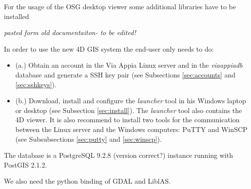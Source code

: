 For the usage of the OSG desktop viewer some additional libraries have to be
installed

{\em pasted form old documentaiton- to be edited!}
 
In order to use the new 4D GIS system the end-user only needs to do:
\begin{itemize} \item (a.) Obtain an account in the Via Appia Linux server and
in the \textit{viaappiadb} database and generate a SSH key pair (see
Subsections \ref{sec:accounts} and \ref{sec:sshkeys}).  \item (b.) Download,
install and configure the \textit{launcher} tool in his Windows laptop or
desktop (see Subsection \ref{sec:install}).  The \textit{launcher} tool also
contains the 4D viewer. It is also recommend to install two tools for the
communication between the Linux server and the Windows computers: PuTTY and
WinSCP (see Subsubsections \ref{sec:putty} and \ref{sec:winscp}).
\end{itemize}

The database is a PostgreSQL 9.2.8 (version correct?) instance running with
PostGIS 2.1.2.

We also need the python binding of GDAL and LiblAS.
